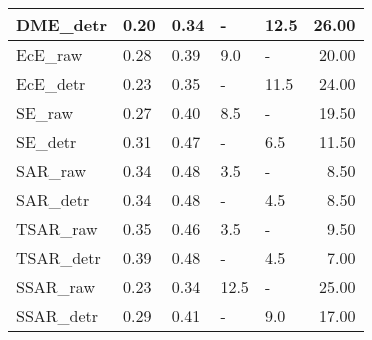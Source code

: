 \begin{tabular}{lllllr}
DME\_detr & 0.20 & 0.34 & - & 12.5 & 26.00 \\
\midrule
EcE\_raw & 0.28 & 0.39 & 9.0 & - & 20.00 \\
EcE\_detr & 0.23 & 0.35 & - & 11.5 & 24.00 \\
\midrule
SE\_raw & 0.27 & 0.40 & 8.5 & - & 19.50 \\
SE\_detr & 0.31 & 0.47 & - & 6.5 & 11.50 \\
\midrule
SAR\_raw & 0.34 & 0.48 & 3.5 & - & 8.50 \\
SAR\_detr & 0.34 & 0.48 & - & 4.5 & 8.50 \\
\midrule
TSAR\_raw & 0.35 & 0.46 & 3.5 & - & 9.50 \\
TSAR\_detr & 0.39 & 0.48 & - & 4.5 & 7.00 \\
\midrule
SSAR\_raw & 0.23 & 0.34 & 12.5 & - & 25.00 \\
SSAR\_detr & 0.29 & 0.41 & - & 9.0 & 17.00 \\
\midrule
\bottomrule
\end{tabular}
\midrule
